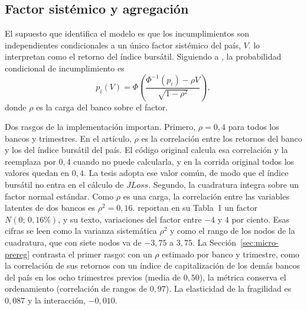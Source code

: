 \subsection{Factor sistémico y agregación}

El supuesto que identifica el modelo es que los incumplimientos son independientes condicionales a un único factor sistémico del país, $V$. \citet{Chari2024b} lo interpretan como el retorno del índice bursátil. Siguiendo a \citet{Vasicek1997}, la probabilidad condicional de incumplimiento es
\[ p_i(V)=\Phi\!\left(\frac{\Phi^{-1}(p_i)-\rho V}{\sqrt{1-\rho^2}}\right), \]
donde $\rho$ es la carga del banco sobre el factor.

Dos rasgos de la implementación importan. Primero, $\rho=0{,}4$ para todos los bancos y trimestres. En el artículo, $\rho$ es la correlación entre los retornos del banco y los del índice bursátil del país. El código original calcula esa correlación y la reemplaza por $0{,}4$ cuando no puede calcularla, y en la corrida original todos los valores quedan en $0{,}4$. La tesis adopta ese valor común, de modo que el índice bursátil no entra en el cálculo de $JLoss$. Segundo, la cuadratura integra sobre un factor normal estándar. Como $\rho$ es una carga, la correlación entre las variables latentes de dos bancos es $\rho^2=0{,}16$. \citet{Chari2024b} reportan en su Tabla~1 un factor $N(0;\,0{,}16\%)$, y su texto, variaciones del factor entre $-4$ y $4$ por ciento. Esas cifras se leen como la varianza sistemática $\rho^2$ y como el rango de los nodos de la cuadratura, que con siete nodos va de $-3{,}75$ a $3{,}75$. La Sección~\ref{sec:micro-prereg} contrasta el primer rasgo: con un $\rho$ estimado por banco y trimestre, como la correlación de sus retornos con un índice de capitalización de los demás bancos del país en los ocho trimestres previos (media de $0{,}50$), la métrica conserva el ordenamiento (correlación de rangos de $0{,}97$). La elasticidad de la fragilidad es $0{,}087$ y la interacción, $-0{,}010$.

